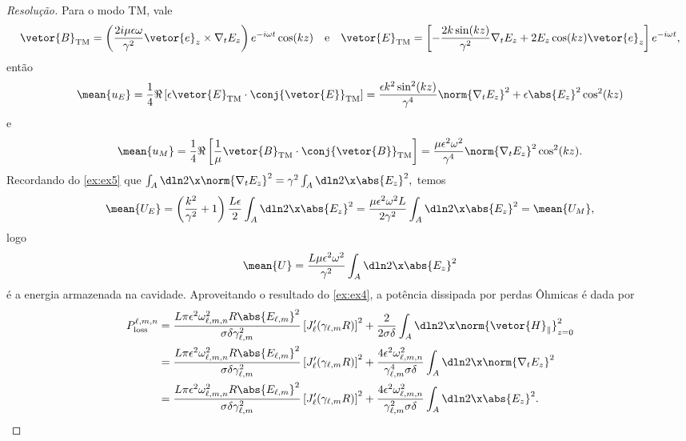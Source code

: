 \begin{proof}[Resolução]
    Para o modo TM, vale
    \begin{equation*}
        \vetor{B}_\mathrm{TM} = \left(\frac{2i \mu \epsilon \omega}{\gamma^2} \vetor{e}_z \times \nabla_t E_z\right) e^{- i\omega t} \cos(kz)
        \quad\text{e}\quad
        \vetor{E}_\mathrm{TM} = \left[-\frac{2k \sin(kz)}{\gamma^2} \nabla_t E_z + 2E_z \cos(kz)\vetor{e}_z\right]e^{-i\omega t},
    \end{equation*}
    então
    \begin{equation*}
        \mean{u_E} = \frac14 \Re\left[\epsilon\vetor{E}_\mathrm{TM} \cdot \conj{\vetor{E}}_\mathrm{TM}\right] = \frac{\epsilon k^2 \sin^2(kz)}{\gamma^4}\norm{\nabla_t E_z}^2 + \epsilon\abs{E_z}^2 \cos^2(kz)
    \end{equation*}
    e
    \begin{equation*}
        \mean{u_M} = \frac14 \Re\left[\frac{1}{\mu} \vetor{B}_\mathrm{TM} \cdot \conj{\vetor{B}}_\mathrm{TM}\right] = \frac{\mu \epsilon^2 \omega^2}{\gamma^4} \norm{\nabla_t E_z}^2 \cos^2(kz).
    \end{equation*}
    Recordando do \cref{ex:ex5} que \(\int_A \dln2\x \norm{\nabla_t E_z}^2 = \gamma^2 \int_A \dln2\x \abs{E_z}^2,\) temos
    \begin{equation*}
        \mean{U_E} = \left(\frac{k^2}{\gamma^2} + 1\right)\frac{L \epsilon}{2} \int_A \dln2\x \abs{E_z}^2 = \frac{\mu \epsilon^2 \omega^2 L}{2\gamma^2} \int_A \dln2\x \abs{E_z}^2 = \mean{U_M},
    \end{equation*}
    logo
    \begin{equation*}
        \mean{U} = \frac{L \mu \epsilon^2 \omega^2}{\gamma^2} \int_A \dln2\x \abs{E_z}^2
    \end{equation*}
    é a energia armazenada na cavidade. Aproveitando o resultado do \cref{ex:ex4}, a potência dissipada por perdas Ôhmicas é dada por
    \begin{align*}
        P^{\ell,m,n}_\mathrm{loss} &= \frac{L \pi \epsilon^2 \omega_{\ell,m,n}^2 R \abs{E_{\ell,m}}^2}{\sigma \delta \gamma_{\ell,m}^2} \left[J_\ell'(\gamma_{\ell,m} R)\right]^2 + \frac{2}{2 \sigma \delta} \int_A \dln2\x \norm{\vetor{H}_\parallel}_{z = 0}^2\\
                        &= \frac{L \pi \epsilon^2 \omega_{\ell,m,n}^2 R \abs{E_{\ell,m}}^2}{\sigma \delta \gamma_{\ell,m}^2} \left[J_\ell'(\gamma_{\ell,m} R)\right]^2 + \frac{4 \epsilon^2 \omega_{\ell,m,n}^2}{\gamma_{\ell,m}^4 \sigma \delta} \int_A \dln2\x \norm{\nabla_t E_z}^2\\
                        &= \frac{L \pi \epsilon^2 \omega_{\ell,m,n}^2 R \abs{E_{\ell,m}}^2}{\sigma \delta \gamma_{\ell,m}^2} \left[J_\ell'(\gamma_{\ell,m} R)\right]^2 + \frac{4 \epsilon^2 \omega_{\ell,m,n}^2}{\gamma_{\ell,m}^2 \sigma \delta} \int_A \dln2\x \abs{E_z}^2.

\end{align*}
\end{proof}
